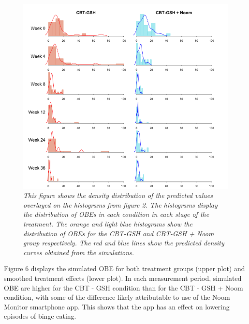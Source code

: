 \documentclass{article}
\begin{document}
\begin{figure}[H]
\centering
\includegraphics[width=\textwidth, height=\textheight, keepaspectratio]{ppc_hist_dens.png}
\caption{\emph{This figure shows the density distribution of the predicted values overlayed on the histograms from figure 2. The histograms display the distribution of OBEs in each condition in each stage of the treatment. The orange and light blue histograms show the distribution of OBEs for the CBT-GSH and CBT-GSH  + Noom group respectively. The red and blue lines show the predicted density curves obtained from the simulations.}}
\end{figure}
Figure 6 displays the simulated OBE for both treatment groups (upper plot) and smoothed treatment effects (lower plot).  In each measurement period, simulated OBE are higher for the CBT - GSH condition than for the CBT - GSH + Noom condition, with some of the difference likely attributable to use of the Noom Monitor smartphone app.  This shows that the app has an effect on lowering episodes of binge eating.
\end{document}
